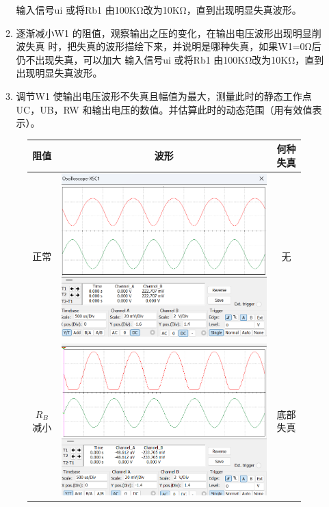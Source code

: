 \documentclass[a4paper,10pt,notitlepage]{article}
\begin{document}
\begin{enumerate}
\begin{enumerate}
				输入信号ui 或将Rb1 由100KΩ改为10KΩ，直到出现明显失真波形。
				\item 逐渐减小W1 的阻值，观察输出之压的变化，在输出电压波形出现明显削波失真
				时，把失真的波形描绘下来，并说明是哪种失真，如果W1=0Ω后仍不出现失真，可以加大
				输入信号ui 或将Rb1 由100KΩ改为10KΩ，直到出现明显失真波形。
				\item 调节W1 使输出电压波形不失真且幅值为最大，测量此时的静态工作点UC，UB，RW
				和输出电压的数值。并估算此时的动态范围（用有效值表示）。
			\end{enumerate}
			\begin{figure}[h]
				\raggedright
				\begin{minipage}{0.19\textwidth}
					\centering
					\begin{tabular}{|c|c|c|}
						\hline
						阻值 & 波形 & 何种失真 \\
						\hline
						正常 & \includegraphics[width=\textwidth]{1-4.png} & 无 \\
						\hline
						$R_B$减小 & \includegraphics[width=\textwidth]{1-11.png} & 底部失真 \\

\end{tabular}
\end{minipage}
\end{figure}
\end{enumerate}
\end{document}
